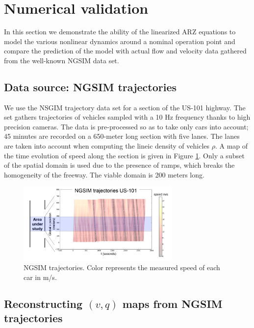 \documentclass[5p,twocolumn]{elsarticle}
\begin{document}
\section{Numerical validation}

In this section we demonstrate the ability of the linearized ARZ equations to model the various nonlinear dynamics around a nominal operation point and compare the prediction of the model with actual flow and velocity data gathered from the well-known NGSIM data set.


\subsection{Data source: NGSIM trajectories}

We use the NSGIM trajectory data set for a section of the US-101 highway. The set gathers trajectories of vehicles sampled with a 10 Hz frequency thanks to high precision cameras. The data is pre-processed so as to take only cars into account; 45 minutes are recorded on a 650-meter long section with five lanes. The lanes are taken into account when computing the lineic density of vehicles $\rho$.
A map of the time evolution of speed along the section is given in Figure \ref{fig:NGSIM-trajectories}.
Only a subset of the spatial domain is used due to the presence of ramps, which breaks the homogeneity of the freeway. The viable domain is 200 meters long.

\begin{figure}
\centering
\includegraphics[width=8cm]{US-101_all_traj_low_res_mod}
\protect\caption{NGSIM trajectories. Color represents the measured speed of each
car in m/s.}
\label{fig:NGSIM-trajectories}
\end{figure}



\subsection{Reconstructing $(v,q)$ maps from NGSIM trajectories}
\end{document}
